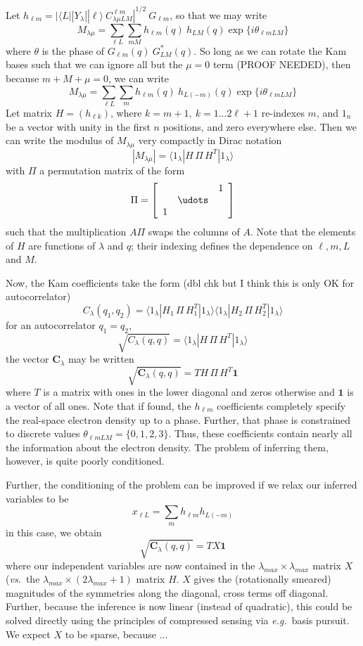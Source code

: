 \documentclass[aps,prl,preprint,groupedaddress]{revtex4-1}
\def\*#1{\mathbf{#1}}
\begin{document}
Let $h_{\ell m} = | \langle L || Y_\lambda || \ell \rangle \> C^{\ell m}_{\lambda \mu LM} |^{1/2}  \> G_{\ell m}$, so that we may write
\[
M_{\lambda \mu} = \sum_{\ell L} \sum_{m M} h_{\ell m}(q) \> h_{L M} (q)
\exp \big\{ i \theta_{\ell m L M} \big\}
\]
where $\theta$ is the phase of $G_{\ell m}(q) \> G_{L M}^* (q)$. So long as we can rotate the Kam bases such that we can ignore all but the $\mu = 0$ term (PROOF NEEDED), then because $m + M + \mu = 0$, we can write
\[
M_{\lambda \mu} = \sum_{\ell L} \sum_{m} h_{\ell m}(q) \> h_{L (-m)} (q)
\exp \big\{ i \theta_{\ell m L M} \big\}
\]
Let matrix $H = (h_{\ell k})$, where $k = m + 1, \ k = 1... 2\ell+1$ re-indexes $m$, and $1_n$ be a vector with unity in the first $n$ positions, and zero everywhere else. Then we can write the modulus of $M_{\lambda \mu}$ very compactly in Dirac notation
\[
| M_{\lambda \mu} | = \langle 1_\lambda | H \, \Pi \, H^T | 1_\lambda \rangle 
\]
with $\Pi$ a permutation matrix of the form
\[
\Pi = \left[ \begin{array}{ccc}
 &  &  1\\
 & \udots  & \\
1 &  &  \\
\end{array} \right]
\]
such that the multiplication $A \Pi$ swaps the columns of $A$. Note that the elements of $H$ are functions of $\lambda$ and $q$; their indexing defines the dependence on $\ell, m, L$ and $M$.

Now, the Kam coefficients take the form (dbl chk but I think this is only OK for autocorrelator)
\[
C_\lambda (q_1, q_2) =
\langle 1_\lambda | H_1 \, \Pi \, H_1^T | 1_\lambda \rangle 
\langle 1_\lambda | H_2 \, \Pi \, H_2^T | 1_\lambda \rangle 
\]
for an autocorrelator $q_1 = q_2$,
\[
\sqrt{C_\lambda (q, q)} =
\langle 1_\lambda | H \, \Pi \, H^T  | 1_\lambda \rangle 
\]
the vector $\*C_\lambda$ may be written
\[
\sqrt{ \*C_\lambda (q,q) } = T H \, \Pi \, H^T \*1
\]
where $T$ is a matrix with ones in the lower diagonal and zeros otherwise and $\*1$ is a vector of all ones. Note that if found, the $h_{\ell m}$ coefficients completely specify the real-space electron density up to a phase. Further, that phase is constrained to discrete values $\theta_{\ell m L M} = \{ 0, 1, 2, 3 \}$. Thus, these coefficients contain nearly all the information about the electron density. The problem of inferring them, however, is quite poorly conditioned.

Further, the conditioning of the problem can be improved if we relax our inferred variables to be
\[
x_{\ell L} = \sum_m h_{\ell m} h_{L (-m)}
\]
in this case, we obtain
\[
\sqrt{ \*C_\lambda (q,q) } = T X \*1
\]
where our independent variables are now contained in the $\lambda_{max} \times \lambda_{max}$ matrix $X$ (\emph{vs.}~the $\lambda_{max} \times (2\lambda_{max} + 1)$ matrix $H$. $X$ gives the (rotationally smeared) magnitudes of the symmetries along the diagonal, cross terms off diagonal. Further, because the inference is now linear (instead of quadratic), this could be solved directly using the principles of compressed sensing via \emph{e.g.}~basis pursuit. We expect $X$ to be sparse, because ...
\end{document}
